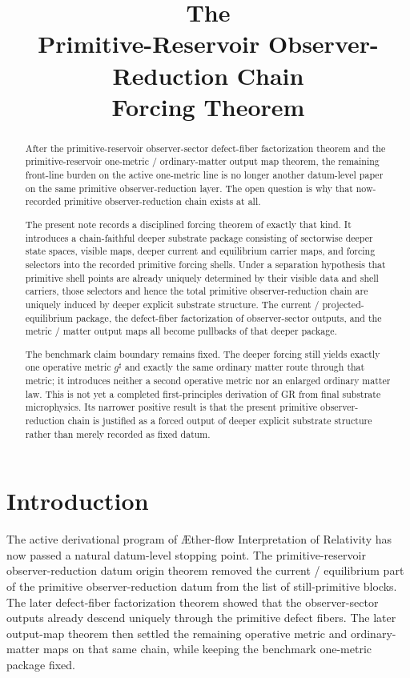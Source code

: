 \documentclass[11pt]{article}
\title{\textbf{The \TheoryName{}}\\[0.4em]
\large Primitive-Reservoir Observer-Reduction Chain\\
\large Forcing Theorem}
\author{}
\date{}
\newcommand{\Aflow}{\AE{}ther-flow}
\newcommand{\TheoryName}{\Aflow{} Interpretation of Relativity}
\newcommand{\CompletedMetric}{g^{\sharp}}
\begin{document}
\maketitle

\begin{abstract}
After the primitive-reservoir observer-sector defect-fiber factorization theorem and the primitive-reservoir one-metric / ordinary-matter output map theorem, the remaining front-line burden on the active one-metric line is no longer another datum-level paper on the same primitive observer-reduction layer. The open question is why that now-recorded primitive observer-reduction chain exists at all.

The present note records a disciplined forcing theorem of exactly that kind. It introduces a chain-faithful deeper substrate package consisting of sectorwise deeper state spaces, visible maps, deeper current and equilibrium carrier maps, and forcing selectors into the recorded primitive forcing shells. Under a separation hypothesis that primitive shell points are already uniquely determined by their visible data and shell carriers, those selectors and hence the total primitive observer-reduction chain are uniquely induced by deeper explicit substrate structure. The current / projected-equilibrium package, the defect-fiber factorization of observer-sector outputs, and the metric / matter output maps all become pullbacks of that deeper package.

The benchmark claim boundary remains fixed. The deeper forcing still yields exactly one operative metric \(\CompletedMetric\) and exactly the same ordinary matter route through that metric; it introduces neither a second operative metric nor an enlarged ordinary matter law. This is not yet a completed first-principles derivation of GR from final substrate microphysics. Its narrower positive result is that the present primitive observer-reduction chain is justified as a forced output of deeper explicit substrate structure rather than merely recorded as fixed datum.
\end{abstract}

\section{Introduction}

The active derivational program of \TheoryName{} has now passed a natural datum-level stopping point. The primitive-reservoir observer-reduction datum origin theorem removed the current / equilibrium part of the primitive observer-reduction datum from the list of still-primitive blocks. The later defect-fiber factorization theorem showed that the observer-sector outputs already descend uniquely through the primitive defect fibers. The later output-map theorem then settled the remaining operative metric and ordinary-matter maps on that same chain, while keeping the benchmark one-metric package fixed.
\end{document}
